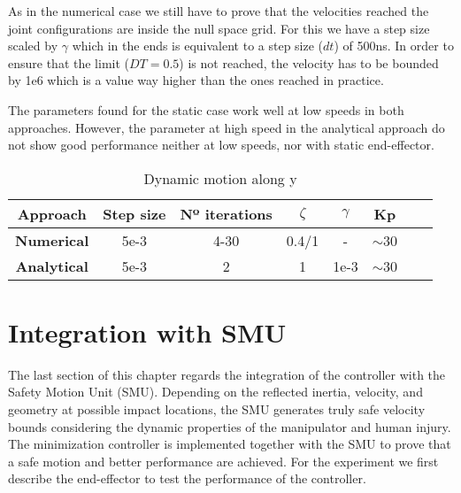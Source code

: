 As in the numerical case we still have to prove that the velocities reached the joint configurations are inside the null space grid. For this we have a step size scaled by $\gamma$ which in the ends is equivalent to a step size ($dt$) of 500ns. In order to ensure that the limit ($DT=0.5$) is not reached, the velocity has to be bounded by 1e6 which is a value way higher than the ones reached in practice.


The parameters found for the static case work well at low speeds in both approaches. However,  the parameter at high speed in the analytical approach do not show good performance neither at low speeds, nor with static end-effector.

\begin{table}[]
	\centering
	\caption{Dynamic motion along y}
	\label{table:dynamic_opt_values}
	\begin{tabular}{|c|c|c|c|c|c|c|c|}
		\hline
		\textbf{Approach}   & \textbf{Step size} & \textbf{Nº iterations} & \textbf{$\zeta$}  &  \textbf{$\gamma$} & \textbf{Kp}  \\ \hline
		\textbf{Numerical}  &  5e-3       & 4-30                          & 0.4/1                  & -         &  ${\sim}$30                          \\  \textbf{Analytical} &   5e-3       & 2                             &  1                  & 1e-3         & ${\sim}$30                         \\ \hline
		
               
	\end{tabular}
\end{table}




\section{Integration with SMU}

The last section of this chapter regards the integration of the controller with the Safety Motion Unit (SMU). Depending on the reflected inertia, velocity, and geometry at possible impact locations, the SMU generates truly safe velocity bounds considering the dynamic properties of the manipulator and human injury. The minimization controller is implemented together with the SMU to prove that a safe motion and better performance are achieved.
For the experiment we first describe the end-effector to test the performance of the controller.


